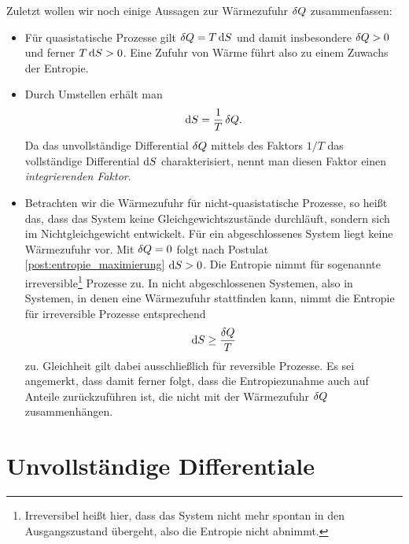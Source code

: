 Zuletzt wollen wir noch einige Aussagen zur Wärmezufuhr $\mathop{}\!\delta Q$ zusammenfassen:
\begin{itemize}
    \item Für quasistatische Prozesse gilt $\mathop{}\!\delta Q=T\mathop{}\!\mathrm{d} S$ und damit insbesondere $\mathop{}\!\delta Q>0$ und ferner $T\mathop{}\!\mathrm{d} S>0$. Eine Zufuhr von Wärme führt also zu einem Zuwachs der Entropie.
    \item Durch Umstellen erhält man
          \begin{align*}
              \mathop{}\!\mathrm{d} S = \frac{1}{T}\mathop{}\!\delta Q.
          \end{align*}
          Da das unvollständige Differential $\mathop{}\!\delta Q$ mittels des Faktors $1/T$ das vollständige Differential $\mathop{}\!\mathrm{d} S$ charakterisiert, nennt man diesen Faktor einen \emph{integrierenden Faktor}.
    \item Betrachten wir die Wärmezufuhr für nicht-quasistatische Prozesse, so heißt das, dass das System keine Gleichgewichtszustände durchläuft, sondern sich im Nichtgleichgewicht entwickelt. Für ein abgeschlossenes System liegt keine Wärmezufuhr vor. Mit $\mathop{}\!\delta Q=0$ folgt nach Postulat \ref{post:entropie_maximierung} $\mathop{}\!\mathrm{d} S >0$. Die Entropie nimmt für sogenannte irreversible\footnote{Irreversibel heißt hier, dass das System nicht mehr spontan in den Ausgangszustand übergeht, also die Entropie nicht abnimmt.} Prozesse zu. In nicht abgeschlossenen Systemen, also in Systemen, in denen eine Wärmezufuhr stattfinden kann, nimmt die Entropie für irreversible Prozesse entsprechend
          \begin{align*}
              \mathop{}\!\mathrm{d} S\geq \frac{\mathop{}\!\delta Q}{T}
          \end{align*}
          zu.
          Gleichheit gilt dabei ausschließlich für reversible Prozesse. Es sei angemerkt, dass damit ferner folgt, dass die Entropiezunahme auch auf Anteile zurückzuführen ist, die nicht mit der Wärmezufuhr $\mathop{}\!\delta Q$ zusammenhängen.
\end{itemize}

\section{Unvollständige Differentiale}

